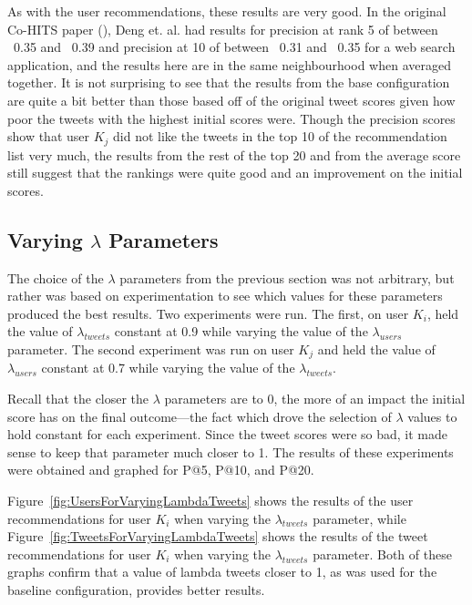 As with the user recommendations, these results are very good. In the original Co-HITS paper (\cite{Deng2009}), Deng et. al. had results for precision at rank 5 of between ~0.35 and ~0.39 and precision at 10 of between ~0.31 and ~0.35 for a web search application, and the results here are in the same neighbourhood when averaged together. It is not surprising to see that the results from the base configuration are quite a bit better than those based off of the original tweet scores given how poor the tweets with the highest initial scores were. Though the precision scores show that user $K_{j}$ did not like the tweets in the top 10 of the recommendation list very much, the results from the rest of the top 20 and from the average score still suggest that the rankings were quite good and an improvement on the initial scores.



\subsection{Varying $\lambda$ Parameters}
\label{sec:VaryingLambda}

The choice of the $\lambda$ parameters from the previous section was not arbitrary, but rather was based on experimentation to see which values for these parameters produced the best results. Two experiments were run. The first, on user $K_{i}$, held the value of $\lambda_{tweets}$ constant at 0.9 while varying the value of the $\lambda_{users}$ parameter. The second experiment was run on user $K_{j}$ and held the value of $\lambda_{users}$ constant at 0.7 while varying the value of the $\lambda_{tweets}$.

Recall that the closer the $\lambda$ parameters are to 0, the more of an impact the initial score has on the final outcome---the fact which drove the selection of $\lambda$ values to hold constant for each experiment. Since the tweet scores were so bad, it made sense to keep that parameter much closer to 1. The results of these experiments were obtained and graphed for P@5, P@10, and P@20.

Figure~\ref{fig:UsersForVaryingLambdaTweets} shows the results of the user recommendations for user $K_{i}$ when varying the $\lambda_{tweets}$ parameter, while Figure~\ref{fig:TweetsForVaryingLambdaTweets} shows the results of the tweet recommendations for user $K_{i}$ when varying the $\lambda_{tweets}$ parameter. Both of these graphs confirm that a value of lambda tweets closer to 1, as was used for the baseline configuration, provides better results.


